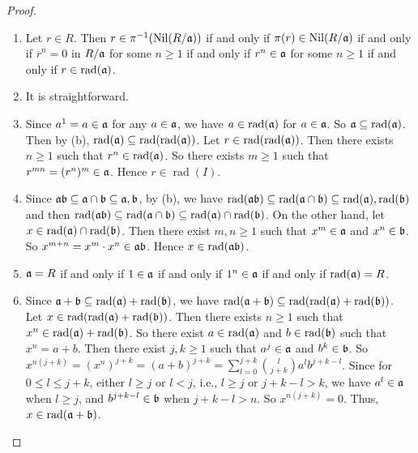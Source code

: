 \begin{proof}
    \begin{enumerate}
        \item Let $r \in R$. Then $r \in \pi^{-1}(\operatorname{Nil}(R/\mathfrak{a}))$ if and only if $\pi(r) \in \operatorname{Nil}(R/\mathfrak{a})$ if and only if $\overbar r^n = 0$ in $R/\mathfrak{a}$ for some $n \geq 1$ if and only if $r^n \in \mathfrak{a}$ for some $n \geq 1$ if and only if $r \in \operatorname{rad}(\mathfrak{a})$.
        \item It is straightforward.
        \item Since $a^1 = a \in \mathfrak{a}$ for any $a \in \mathfrak{a}$, we have $a \in \operatorname{rad}(\mathfrak{a})$ for $a \in \mathfrak{a}$. So $\mathfrak{a} \subseteq \operatorname{rad}(\mathfrak{a})$. Then by (b), $\operatorname{rad}(\mathfrak{a}) \subseteq \operatorname{rad}(\operatorname{rad}(\mathfrak{a}))$. Let $r \in \operatorname{rad}(\operatorname{rad}(\mathfrak{a}))$. Then there exists $n \geq 1$ such that $r^n \in \operatorname{rad}(\mathfrak{a})$. So there exists $m \geq 1$ such that $r^{mn} = (r^n)^m \in \mathfrak{a}$. Hence $r \in \operatorname{rad}(I)$. 
        \item Since $\mathfrak{a}\mathfrak{b} \subseteq \mathfrak{a} \cap \mathfrak{b} \subseteq \mathfrak{a},\mathfrak{b}$, by (b), we have $\operatorname{rad}(\mathfrak{a}\mathfrak{b}) \subseteq \operatorname{rad}(\mathfrak{a} \cap \mathfrak{b}) \subseteq \operatorname{rad}(\mathfrak{a}),\operatorname{rad}(\mathfrak{b})$ and then $\operatorname{rad}(\mathfrak{a}\mathfrak{b}) \subseteq \operatorname{rad}(\mathfrak{a} \cap \mathfrak{b}) \subseteq \operatorname{rad}(\mathfrak{a}) \cap \operatorname{rad}(\mathfrak{b})$. On the other hand, let $x \in \operatorname{rad}(\mathfrak{a}) \cap \operatorname{rad}(\mathfrak{b})$. Then there exist $m,n \geq 1$ such that $x^m \in \mathfrak{a}$ and $x^n \in \mathfrak{b}$. So $x^{m+n} = x^m \cdot x^n \in \mathfrak{a} \mathfrak{b}$. Hence $x \in \operatorname{rad}(\mathfrak{a}\mathfrak{b})$.
        \item $\mathfrak{a} = R$ if and only if $1 \in \mathfrak{a}$ if and only if $1^n \in \mathfrak{a}$ if and only if $\operatorname{rad}(\mathfrak{a}) = R$. 
        \item Since $\mathfrak{a} + \mathfrak{b} \subseteq \operatorname{rad}(\mathfrak{a}) + \operatorname{rad}(\mathfrak{b})$, we have $\operatorname{rad}(\mathfrak{a} + \mathfrak{b}) \subseteq \operatorname{rad}(\operatorname{rad}(\mathfrak{a}) + \operatorname{rad}(\mathfrak{b}))$. \\
            Let $x \in \operatorname{rad}(\operatorname{rad}(\mathfrak{a}) + \operatorname{rad}(\mathfrak{b}))$. Then there exists $n \geq 1$ such that $x^n \in \operatorname{rad}(\mathfrak{a}) + \operatorname{rad}(\mathfrak{b})$. So there exist $a \in \operatorname{rad}(\mathfrak{a})$ and $b \in \operatorname{rad}(\mathfrak{b})$ such that $x^n = a + b$. Then there exist $j,k \geq 1$ such that $a^j \in \mathfrak{a}$ and $b^k \in \mathfrak{b}$. So $x^{n(j+k)} = (x^n)^{j+k} = (a+b)^{j+k} = \sum_{l = 0}^{j+k} \binom{l}{j+k} a^lb^{j+k-l}$. Since for $0 \leq l \leq j+k$, either $l \geq j$ or $l < j$, i.e., $l \geq j$ or $j+k-l > k$, we have $a^l \in \mathfrak{a}$ when $l \geq j$, and $b^{j+k-l} \in \mathfrak{b}$ when $j + k - l > n$. So $x^{n(j+k)} = 0$. Thus, $x\in \operatorname{rad}(\mathfrak{a}+\mathfrak{b})$.

\end{enumerate}
\end{proof}
